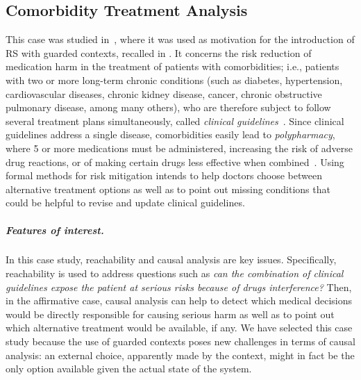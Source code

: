 
\subsection{Comorbidity Treatment Analysis}

This case was studied in~\cite{DBLP:conf/cmsb/BowlesBBFGM24}, where it was used as motivation for the introduction of RS with guarded contexts, recalled in . It concerns the risk reduction of medication harm in the treatment of patients with comorbidities; i.e., patients with two or more long-term chronic conditions (such as diabetes, hypertension, cardiovascular diseases, chronic kidney disease, cancer, chronic obstructive pulmonary disease, among many others), who are therefore subject to follow several treatment plans simultaneously, called \emph{clinical guidelines}~\cite{feder1999using,woolf1999potential}. Since clinical guidelines address a single disease, comorbidities easily lead to  \emph{polypharmacy}, where 5 or more medications must be administered, increasing the risk of adverse drug reactions, or of making certain drugs less effective when combined~\cite{Gut12}. Using formal methods for risk mitigation intends to help doctors choose between alternative treatment options as well as to point out missing conditions that could be helpful to revise and update clinical guidelines. 

\subparagraph*{Features of interest.}
In this case study, reachability and causal analysis are key issues.
Specifically, reachability is used to address questions such as \emph{can the combination of clinical guidelines expose the patient at serious risks because of drugs interference?}
Then, in the affirmative case, causal analysis can help to detect which medical decisions would be directly responsible for causing serious harm as well as to point out  which alternative treatment would be available, if any.
We have selected this case study because the use of guarded contexts poses new challenges in terms of causal analysis: an external choice, apparently made by the context, might in fact be the only option available given the actual state of the system. 

